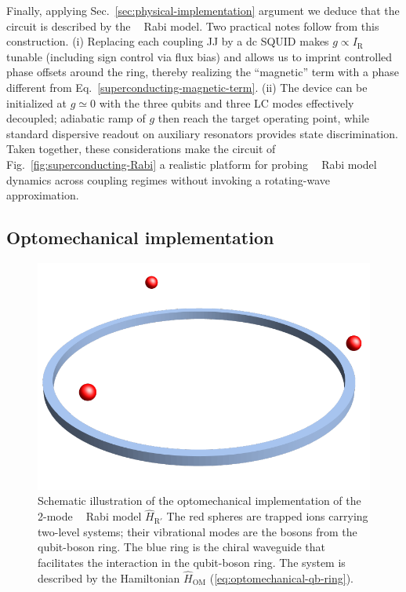 \documentclass[reprint, aps, prx, amsmath, amssymb, longbibliography, superscriptaddress]{revtex4-2}
\DeclareMathOperator{\Zthree}{\mathbb{Z}_3}
\begin{document}
Finally, applying Sec.~\ref{sec:physical-implementation} argument we deduce that the circuit is described by the $\Zthree$ Rabi model. Two practical notes follow from this construction. (i) Replacing each coupling JJ by a dc SQUID makes $g \propto I_{\mathrm{R}}$ tunable (including sign control via flux bias) and allows us to imprint controlled phase offsets around the ring, thereby realizing the ``magnetic'' term with a phase different from Eq.~\eqref{superconducting-magnetic-term}. (ii) The device can be initialized at $g\simeq 0$ with the three qubits and three LC modes effectively decoupled; adiabatic ramp of $g$ then reach the target operating point, while standard dispersive readout on auxiliary resonators provides state discrimination. Taken together, these considerations make the circuit of Fig.~\ref{fig:superconducting-Rabi} a realistic platform for probing $\Zthree$ Rabi model dynamics across coupling regimes without invoking a rotating-wave approximation.


\subsection{Optomechanical implementation}
\label{optomechanical-implementation}

\begin{figure}
    \includegraphics[width=0.8\linewidth]{pics/optomechanical_Rabi_pic.pdf}
    \caption{Schematic illustration of the optomechanical implementation of the 2-mode $\Zthree$ Rabi model $\hat H_{\text{R}'}$ \cite{sedov_chiral_2020} The red spheres are trapped ions carrying two-level systems; their vibrational modes are the bosons from the qubit-boson ring. The blue ring is the chiral waveguide that facilitates the interaction in the qubit-boson ring. The system is described by the Hamiltonian $\hat H_{\text{OM}}$ (\ref{eq:optomechanical-qb-ring}).}
    \label{fig:optomechanical-rabi}
\end{figure}
\end{document}
